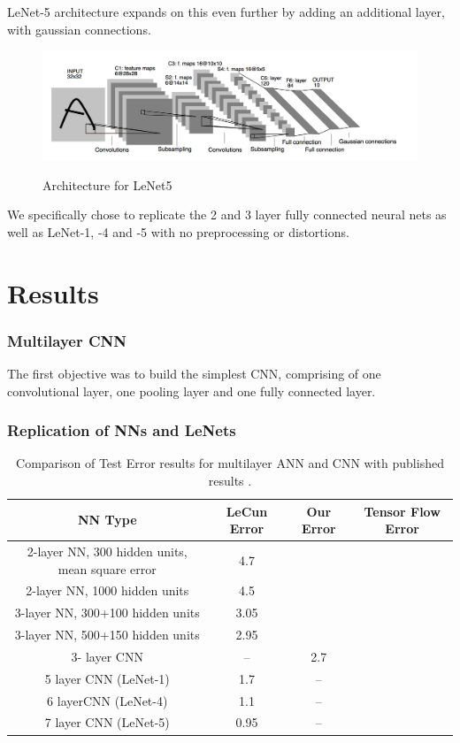 \documentclass[12pt, twocolumn]{article}
\begin{document}
LeNet-5 architecture expands on this even further by adding an additional layer, with gaussian connections. 

 \begin{figure}
\includegraphics[scale=.6]{LeNet5.png}
\label{fig:LeNet5}
\caption{Architecture for LeNet5 \cite{LeCun1998}}
\end{figure}


 We specifically chose to replicate the 2 and 3 layer fully connected neural nets as well as LeNet-1, -4 and -5 with no preprocessing or distortions. 


\section{Results}
\subsubsection{Multilayer CNN}
The first objective was to build the simplest CNN, comprising of one convolutional layer, one pooling layer and one fully connected layer. 


\subsubsection{Replication of NNs and LeNets}





\begin{center}
\begin{table}[t]
\begin{tabular} { |c | c | c | c | }
    \hline
    NN Type & LeCun Error  &  Our Error  & Tensor Flow Error \\ \hline
    2-layer NN, 300 hidden units, mean square error & 4.7 &  & \\ \hline
    2-layer NN, 1000 hidden units & 4.5 & & \\ \hline
    3-layer NN, 300+100 hidden units & 3.05 & &  \\ \hline
    3-layer NN, 500+150 hidden units & 2.95 & & \\ \hline
    3- layer CNN &  -- &  2.7 &  \\ \hline
    5 layer CNN  (LeNet-1) & 1.7 & -- & \\ \hline 
    6 layerCNN (LeNet-4) & 1.1& -- & \\ \hline 
    7 layer CNN (LeNet-5) &  0.95 &  -- &\\ \hline
\end{tabular}
\label{table: MNISTLeCun}
\caption{Comparison of Test Error results for multilayer ANN and CNN with published results \cite{LeCun1998}.}
\end{table}
\end{center}
\end{document}

